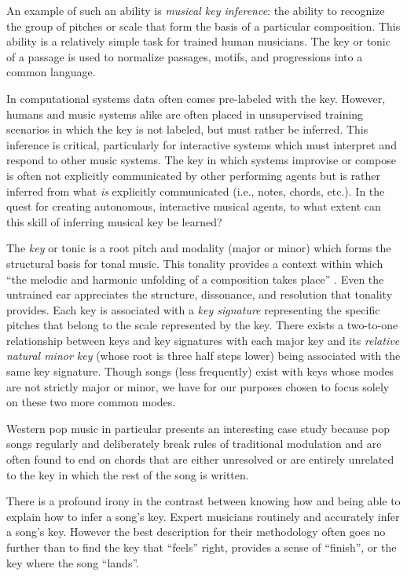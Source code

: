 \documentclass[letterpaper]{article}
\begin{document}
An example of such an ability is \emph{musical key inference}: the ability to recognize the group of pitches or scale that form the basis of a particular composition. This ability is a relatively simple task for trained human musicians. The key or tonic of a passage is used to normalize passages, motifs, and progressions into a common language.

In computational systems data often comes pre-labeled with the key. However, humans and music systems alike are often placed in unsupervised training scenarios in which the key is not labeled, but must rather be inferred. This inference is critical, particularly for interactive systems which must interpret and respond to other music systems. The key in which systems improvise or compose is often not explicitly communicated by other performing agents but is rather inferred from what \emph{is} explicitly communicated (i.e., notes, chords, etc.). In the quest for creating autonomous, interactive musical agents, to what extent can this skill of inferring musical key be learned?

The \emph{key} or tonic is a root pitch and modality (major or minor) which forms the structural basis for tonal music. This tonality provides a context within which ``the melodic and harmonic unfolding of a composition takes place'' \cite{vos1996parallel}. Even the untrained ear appreciates the structure, dissonance, and resolution that tonality provides. Each key is associated with a \emph{key signature}  representing the specific pitches that belong to the scale represented by the key. There exists a two-to-one relationship between keys and key signatures with each major key and its \emph{relative natural minor key} (whose root is three half steps lower) being associated with the same key signature. Though songs (less frequently) exist with keys whose modes are not strictly major or minor, we have for our purposes chosen to focus solely on these two more common modes.

Western pop music in particular presents an interesting case study because pop songs regularly and deliberately break rules of traditional modulation and are often found to end on chords that are either unresolved or are entirely unrelated to the key in which the rest of the song is written.

There is a profound irony in the contrast between knowing how and being able to explain how to infer a song's key. Expert musicians routinely and accurately infer a song's key. However the best description for their methodology often goes no further than to find the key that ``feels'' right, provides a sense of ``finish'', or the key where the song ``lands''.
\end{document}
